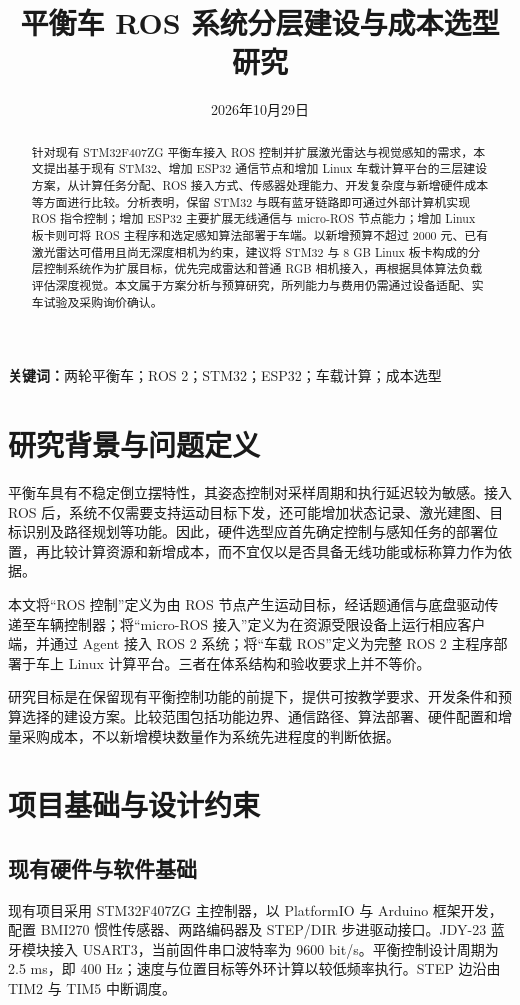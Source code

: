 \documentclass[UTF8,fontset=none,a4paper,11pt]{ctexart}
\title{\docheiti 平衡车 ROS 系统分层建设与成本选型研究}
\author{}
\date{2026年10月29日}
\begin{document}
\maketitle
\vspace{-1.5em}
\begin{abstract}
针对现有 STM32F407ZG 平衡车接入 ROS 控制并扩展激光雷达与视觉感知的需求，本文提出基于现有 STM32、增加 ESP32 通信节点和增加 Linux 车载计算平台的三层建设方案，从计算任务分配、ROS 接入方式、传感器处理能力、开发复杂度与新增硬件成本等方面进行比较。分析表明，保留 STM32 与既有蓝牙链路即可通过外部计算机实现 ROS 指令控制；增加 ESP32 主要扩展无线通信与 micro-ROS 节点能力；增加 Linux 板卡则可将 ROS 主程序和选定感知算法部署于车端。以新增预算不超过 2000 元、已有激光雷达可借用且尚无深度相机为约束，建议将 STM32 与 8 GB Linux 板卡构成的分层控制系统作为扩展目标，优先完成雷达和普通 RGB 相机接入，再根据具体算法负载评估深度视觉。本文属于方案分析与预算研究，所列能力与费用仍需通过设备适配、实车试验及采购询价确认。
\end{abstract}
\noindent\textbf{关键词：}两轮平衡车；ROS 2；STM32；ESP32；车载计算；成本选型

\section{研究背景与问题定义}
平衡车具有不稳定倒立摆特性，其姿态控制对采样周期和执行延迟较为敏感。接入 ROS 后，系统不仅需要支持运动目标下发，还可能增加状态记录、激光建图、目标识别及路径规划等功能。因此，硬件选型应首先确定控制与感知任务的部署位置，再比较计算资源和新增成本，而不宜仅以是否具备无线功能或标称算力作为依据。

本文将“ROS 控制”定义为由 ROS 节点产生运动目标，经话题通信与底盘驱动传递至车辆控制器；将“micro-ROS 接入”定义为在资源受限设备上运行相应客户端，并通过 Agent 接入 ROS 2 系统；将“车载 ROS”定义为完整 ROS 2 主程序部署于车上 Linux 计算平台。三者在体系结构和验收要求上并不等价\cite{uros_pio,uros_stm32}。

研究目标是在保留现有平衡控制功能的前提下，提供可按教学要求、开发条件和预算选择的建设方案。比较范围包括功能边界、通信路径、算法部署、硬件配置和增量采购成本，不以新增模块数量作为系统先进程度的判断依据。

\section{项目基础与设计约束}
\subsection{现有硬件与软件基础}
现有项目采用 STM32F407ZG 主控制器，以 PlatformIO 与 Arduino 框架开发，配置 BMI270 惯性传感器、两路编码器及 STEP/DIR 步进驱动接口。JDY-23 蓝牙模块接入 USART3，当前固件串口波特率为 9600 bit/s。平衡控制设计周期为 2.5 ms，即 400 Hz；速度与位置目标等外环计算以较低频率执行。STEP 边沿由 TIM2 与 TIM5 中断调度\cite{project_docs}。
\end{document}
